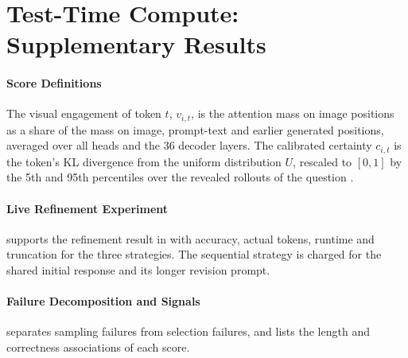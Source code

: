 \documentclass{article}
\newcommand{\apptable}[1]{\footnotesize\setlength{\tabcolsep}{3pt}}
\begin{document}
\begin{table}[H]
  \centering
  \caption{Training cost by stage on one T4 GPU, with the one-off feature caching. The frozen backbone kept peak memory under 1.7 GB.}
  \label{tab:t2res}
  \apptable{tables/t2_resources.tex}
\end{table}

\section{Test-Time Compute: Supplementary Results}
\label{app:t3}
\paragraph{Score Definitions}
\label{app:t3defs}
The visual engagement of token $t$, $v_{i,t}$, is the attention mass on image positions as a share of the mass on image, prompt-text and earlier generated positions, averaged over all heads and the 36 decoder layers. The calibrated certainty $c_{i,t}$ is the token's KL divergence from the uniform distribution $U$, rescaled to $[0,1]$ by the 5th and 95th percentiles over the revealed rollouts of the question \citep{visconf}.

\paragraph{Live Refinement Experiment}
 supports the refinement result in  with accuracy, actual tokens, runtime and truncation for the three strategies. The sequential strategy is charged for the shared initial response and its longer revision prompt.

\begin{table}[H]
  \centering
  \caption{Live comparison on 50 MATH questions with Qwen2.5-3B-Instruct (FP16, batch 1, one T4). Tokens and seconds are per question. Refinement answered the most questions at less output than parallel sampling.}
  \label{tab:t3live}
  \apptable{tables/t3_live.tex}
\end{table}

\paragraph{Failure Decomposition and Signals}
 separates sampling failures from selection failures, and  lists the length and correctness associations of each score.

\begin{table}[H]
  \centering
  \caption{Coverage, sampling failures (no correct rollout) and selection failures (a correct rollout missed), in percent of held-out question orders. Selection failures grow with $N$.}
  \label{tab:t3fail}
  \apptable{tables/t3_failures.tex}
\end{table}
\end{document}
